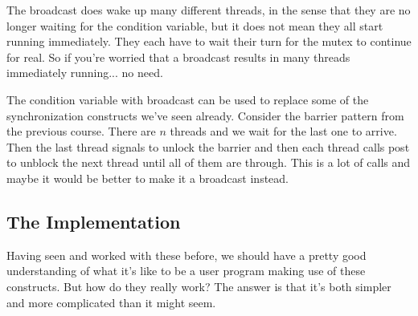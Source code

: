 The broadcast does wake up many different threads, in the sense that they are no longer waiting for the condition variable, but it does not mean they all start running immediately. They each have to wait their turn for the mutex to continue for real. So if you're worried that a broadcast results in many threads immediately running... no need.

The condition variable with broadcast can be used to replace some of the synchronization constructs we've seen already. Consider the barrier pattern from the previous course. There are $n$ threads and we wait for the last one to arrive. Then the last thread signals to unlock the barrier and then each thread calls post to unblock the next thread until all of them are through. This is a lot of calls and maybe it would be better to make it a broadcast instead. 


\subsection*{The Implementation}
Having seen and worked with these before, we should have a pretty good understanding of what it's like to be a user program making use of these constructs. But how do they really work? The answer is that it's both simpler and more complicated than it might seem. 




